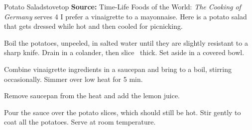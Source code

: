 \begin{recipe}{Potato Salad}{\hfill stovetop \hfill}{\textbf{Source:} Time-Life Foods of the World: \textit{The Cooking of Germany} \hfill serves 4}
  \freeform I prefer a vinaigrette to a mayonnaise. Here is a potato salad that gets dressed while hot and then cooled for picnicking.

Boil the potatoes, unpeeled, in salted water until they are slightly resistant to a sharp knife. Drain in a colander, then slice \inch\, thick. Set aside in a covered bowl.

Combine vinaigrette ingredients in a saucepan and bring to a boil, stirring occasionally. Simmer over low heat for 5 min.

Remove saucepan from the heat and add the lemon juice.

\newstep Pour the sauce over the potato slices, which should still be hot. Stir gently to coat all the potatoes. Serve at room temperature.
\end{recipe}